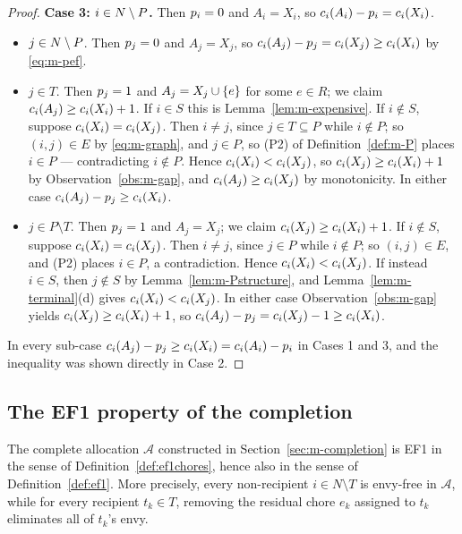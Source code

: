 \begin{proof}
\smallskip
\noindent\textbf{Case 3: $i \in N \setminus P$.} Then $p_i = 0$
and $A_i = X_i$, so $c_i(A_i) - p_i = c_i(X_i)$.
\begin{itemize}
  \item[(3a)] $j \in N \setminus P$. Then $p_j = 0$ and
    $A_j = X_j$, so $c_i(A_j) - p_j = c_i(X_j) \ge c_i(X_i)$
    by \eqref{eq:m-pef}.
  \item[(3b)] $j \in T$. Then $p_j = 1$ and $A_j = X_j \cup \left\{e\right\}$ for
    some $e \in R$; we claim $c_i(A_j) \ge c_i(X_i) + 1$. If $i \in S$
    this is Lemma~\ref{lem:m-expensive}. If $i \notin S$, suppose
    $c_i(X_i) = c_i(X_j)$. Then $i \ne j$, since $j \in T \subseteq P$
    while $i \notin P$; so $(i,j) \in E$ by \eqref{eq:m-graph}, and $j \in P$,
    so (P2) of Definition~\ref{def:m-P} places $i \in P$ --- contradicting
    $i \notin P$. Hence $c_i(X_i) < c_i(X_j)$, so
    $c_i(X_j) \ge c_i(X_i) + 1$ by Observation~\ref{obs:m-gap}, and
    $c_i(A_j) \ge c_i(X_j)$ by monotonicity. In either case
    $c_i(A_j) - p_j \ge c_i(X_i)$.
  \item[(3c)] $j \in P \setminus T$. Then $p_j = 1$ and $A_j = X_j$; we
    claim $c_i(X_j) \ge c_i(X_i) + 1$. If $i \notin S$, suppose
    $c_i(X_i) = c_i(X_j)$. Then $i \ne j$, since $j \in P$ while
    $i \notin P$; so $(i,j) \in E$, and (P2) places $i \in P$, a contradiction.
    Hence $c_i(X_i) < c_i(X_j)$. If instead $i \in S$, then $j \notin S$
    by Lemma~\ref{lem:m-Pstructure}, and Lemma~\ref{lem:m-terminal}(d) gives
    $c_i(X_i) < c_i(X_j)$. In either case
    Observation~\ref{obs:m-gap} yields $c_i(X_j) \ge c_i(X_i) + 1$, so
    $c_i(A_j) - p_j = c_i(X_j) - 1 \ge c_i(X_i)$.
\end{itemize}

\smallskip
In every sub-case $c_i(A_j) - p_j \ge c_i(X_i) = c_i(A_i) -
p_i$ in Cases 1 and 3, and the inequality was shown directly in Case 2.
\end{proof}

\subsection{The EF1 property of the completion}
\begin{corollary}\label{cor:ef1}
The complete allocation $\mathcal{A}$ constructed in Section~\ref{sec:m-completion}
is EF1 in the sense of Definition~\ref{def:ef1chores}, hence also in the
sense of Definition~\ref{def:ef1}. More precisely, every non-recipient $i\in N\setminus T$ is envy-free in
$\mathcal{A}$, while for every recipient $t_k\in T$, removing the residual
chore $e_k$ assigned to $t_k$ eliminates all of $t_k$'s envy.
\end{corollary}

